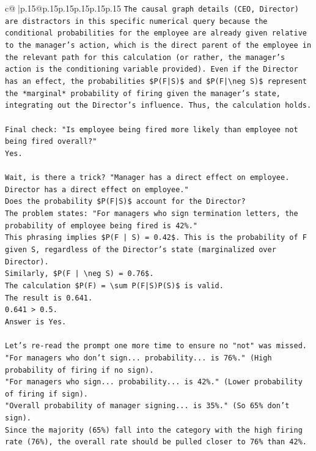 \documentclass{article}
\begin{document}
{\begin{supertabular}{c@{$\;$}|p{.15\linewidth}@{}p{.15\linewidth}p{.15\linewidth}p{.15\linewidth}p{.15\linewidth}p{.15\linewidth}}
{{{\texttt{The causal graph details (CEO, Director) are distractors in this specific numerical query because the conditional probabilities for the employee are already given relative to the manager's action, which is the direct parent of the employee in the relevant path for this calculation (or rather, the manager's action is the conditioning variable provided). Even if the Director has an effect, the probabilities \$P(F|S)\$ and \$P(F|\textbackslash{}neg S)\$ represent the *marginal* probability of firing given the manager's state, integrating out the Director's influence. Thus, the calculation holds.} \\
\\ 
\texttt{Final check: "Is employee being fired more likely than employee not being fired overall?"} \\
\texttt{Yes.} \\
\\ 
\texttt{Wait, is there a trick? "Manager has a direct effect on employee. Director has a direct effect on employee."} \\
\texttt{Does the probability \$P(F|S)\$ account for the Director?} \\
\texttt{The problem states: "For managers who sign termination letters, the probability of employee being fired is 42\%."} \\
\texttt{This phrasing implies \$P(F | S) = 0.42\$. This is the probability of F given S, regardless of the Director's state (marginalized over Director).} \\
\texttt{Similarly, \$P(F | \textbackslash{}neg S) = 0.76\$.} \\
\texttt{The calculation \$P(F) = \textbackslash{}sum P(F|S)P(S)\$ is valid.} \\
\texttt{The result is 0.641.} \\
\texttt{0.641 > 0.5.} \\
\texttt{Answer is Yes.} \\
\\ 
\texttt{Let's re{-}read the prompt one more time to ensure no "not" was missed.} \\
\texttt{"For managers who don't sign... probability... is 76\%." (High probability of firing if no sign).} \\
\texttt{"For managers who sign... probability... is 42\%." (Lower probability of firing if sign).} \\
\texttt{"Overall probability of manager signing... is 35\%." (So 65\% don't sign).} \\
\texttt{Since the majority (65\%) fall into the category with the high firing rate (76\%), the overall rate should be pulled closer to 76\% than 42\%.} \\
}}}
\end{supertabular}}
\end{document}
